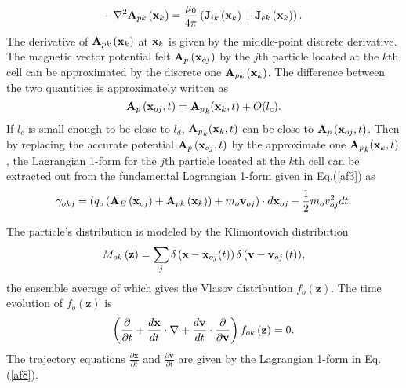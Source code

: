 \documentclass[12pt]{iopart}
\begin{document}
\begin{equation}\label{af6}
- {\nabla ^2}{{\bf{A}}_{pk}}\left( {{{\bf{x}}_k}} \right) = \frac{{{\mu _0}}}{{4\pi }}\left( {{{\bf{J}}_{ik}}\left( {{{\bf{x}}_k}} \right) + {{\bf{J}}_{ek}}\left( {{{\bf{x}}_k}} \right)} \right).
\end{equation}
The derivative of ${{\bf{A}}_{pk}}\left( {{{\bf{x}}_k}} \right)$ at ${{{\bf{x}}_k}}$ is given by the middle-point discrete derivative. The magnetic vector potential felt ${{\bf{A}}_p}\left( {{{\bf{x}}_{oj}}} \right)$ by the $j$th particle located at the $k$th cell can be approximated by the discrete one ${{\bf{A}}_{pk}}\left( {{{\bf{x}}_k}} \right)$. The difference between the two quantities is approximately written as
\begin{equation}\label{af7}
{{\bf{A}}_p}\left( {{{\bf{x}}_{oj}},t} \right) = {{\bf{A}}_p}_k({{\bf{x}}_k},t) + O({l_c}).
\end{equation}
If $l_c$ is small enough to be close to $l_d$,  ${{\bf{A}}_p}_k({{\bf{x}}_k},t)$ can be close to ${{\bf{A}}_p}\left( {{{\bf{x}}_{oj}},t} \right)$. Then by replacing the accurate potential ${{\bf{A}}_p}\left( {{{\bf{x}}_{oj}},t} \right)$ by the approximate one ${{\bf{A}}_p}_k({{\bf{x}}_k},t)$, the Lagrangian 1-form for the $j$th particle located at the $k$th cell can be extracted out from the fundamental Lagrangian 1-form given in Eq.(\ref{af3}) as
\begin{equation}\label{af8}
\gamma_{okj}  = \left( {{q_o}\left( {{{\bf{A}}_E}\left( {{{\bf{x}}_{oj}}} \right) + {{\bf{A}}_{pk}}\left( {{{\bf{x}}_k}} \right)} \right) + {m_o}{{\bf{v}}_{oj}}} \right)\cdot d{{\bf{x}}_{oj}} - \frac{1}{2}{m_o}v_{oj}^2dt.
\end{equation}

The particle's distribution is modeled by the Klimontovich distribution
\begin{equation}\label{af9}
{M_{ok}}\left( {\bf{z}} \right) = \sum\limits_j {\delta \left( {{\bf{x}} - {{\bf{x}}_{oj}}(t)} \right)\delta \left( {{\bf{v}} - {{\bf{v}}_{oj}}\left( t \right)} \right)},
\end{equation}
the ensemble average of which gives the Vlasov distribution $f_o(\mathbf{z})$.
The time evolution of  $f_o(\mathbf{z})$ is
\begin{equation}\label{af10}
\left( {\frac{\partial }{{\partial t}} + \frac{{d{\bf{x}}}}{{dt}}\cdot\nabla  + \frac{{d{\bf{v}}}}{{dt}}\cdot\frac{\partial }{{\partial {\bf{v}}}}} \right)f_{ok}\left(\mathbf{z} \right) = 0.
\end{equation}
The trajectory equations $\frac{\partial \mathbf{x}}{\partial t}$ and $\frac{\partial \mathbf{v}}{\partial t}$ are given by the Lagrangian 1-form in Eq.(\ref{af8}).
\end{document}
